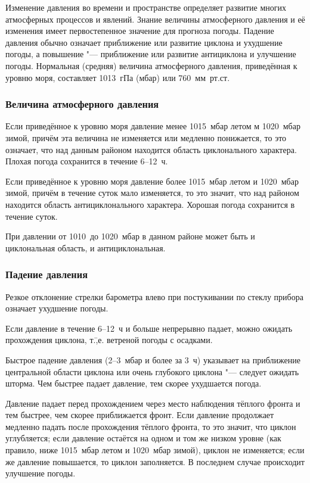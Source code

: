 Изменение давления во времени и пространстве определяет развитие
многих атмосферных процессов и явлений. Знание величины атмосферного
давления и её изменения имеет первостепенное значение для прогноза
погоды. Падение давления обычно означает приближение или развитие
циклона и ухудшение погоды, а повышение "--- приближение или развитие
антициклона и улучшение погоды. Нормальная (средняя) величина
атмосферного давления, приведённая к уровню моря, составляет 1013~гПа
(мбар) или 760~мм~рт.ст.

\subsubsection{Величина атмосферного давления}

 Если приведённое к уровню моря давление менее 1015~мбар летом
м 1020~мбар зимой, причём эта величина не изменяется или медленно
понижается, то это означает, что над данным районом находится область
циклонального характера. Плохая погода сохранится в течение 6--12~ч.

 Если приведённое к уровню моря давление более 1015~мбар летом
и 1020~мбар зимой, причём в течение суток мало изменяется, то это
значит, что над районом находится область антициклонального
характера. Хорошая погода сохранится в течение суток.

 При давлении от 1010~до 1020~мбар в данном районе может быть и
циклональная область, и антициклональная.

\subsubsection{Падение давления}

 Резкое отклонение стрелки барометра влево при постукивании по
стеклу прибора означает ухудшение погоды.

 Если давление в течение 6--12~ч и больше непрерывно падает, можно
ожидать прохождения циклона, т.\=,е. ветреной погоды с осадками.

 Быстрое падение давления (2--3~мбар и более за 3~ч)
указывает на приближение центральной области циклона или очень
глубокого циклона "--- следует ожидать шторма. Чем быстрее падает
давление, тем скорее ухудшается погода.

 Давление падает перед прохождением через место наблюдения
тёплого фронта и тем быстрее, чем скорее приближается фронт. Если
давление продолжает медленно падать после прохождения тёплого фронта,
то это значит, что циклон углубляется; если давление остаётся на одном
и том же низком уровне (как правило, ниже 1015~мбар летом и 1020~мбар
зимой), циклон не изменяется; если же давление повышается, то циклон
заполняется. В последнем случае происходит улучшение погоды.

